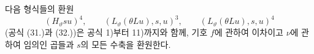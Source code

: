 
다음 형식들의 환원
\[
(H_\vartheta su)^4,
\qquad (L_\vartheta(\theta Lu),s,u)^3,
\qquad (L_\vartheta(\theta Lu),s,u)^4
\]
(공식 (31.)과 (32.))은 공식 1)부터 11)까지와 함께, 기호 $f$에 관하여 이차이고 $\nu$에 관하여 임의인 곱들과 $s$의 모든 수축을 환원한다.
